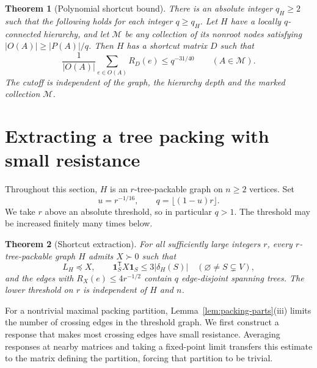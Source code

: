 \documentclass[11pt]{amsart}
\newtheorem{theorem}{Theorem}[section]
\theoremstyle{definition}
\theoremstyle{remark}
\numberwithin{equation}{section}
\begin{document}
\begin{theorem}[Polynomial shortcut bound]\label{thm:hierarchy-power}
There is an absolute integer $q_H\ge2$ such that the following holds for
each integer $q\ge q_H$.  Let $H$ have a locally $q$-connected hierarchy,
and let $\mathcal M$ be any collection of its nonroot nodes satisfying
$|O(A)|\ge |P(A)|/q$.  Then $H$ has a shortcut matrix $D$ such that
\begin{equation}\label{eq:hierarchy-power}
 \frac{1}{|O(A)|}\sum_{e\in O(A)}R_D(e)\le q^{-31/40}
 \qquad(A\in\mathcal M).
\end{equation}
The cutoff is independent of the graph, the hierarchy depth and the
marked collection $\mathcal M$.
\end{theorem}

\section{Extracting a tree packing with small resistance}
\label{sec:extraction}

Throughout this section, \(H\) is an \(r\)-tree-packable graph on
\(n\ge2\) vertices. Set
\begin{equation}\label{eq:parameters}
 u=r^{-1/16},\qquad q=\lfloor(1-u)r\rfloor.
\end{equation}
We take \(r\) above an absolute threshold, so in particular \(q>1\).
The threshold may be increased finitely many times below.

\begin{theorem}[Shortcut extraction]\label{thm:extraction}
For all sufficiently large integers \(r\), every \(r\)-tree-packable
graph \(H\) admits \(X\succ0\) such that
\begin{equation}\label{eq:shortcut-X}
 L_H\preceq X,\qquad
 \mathbf1_S^{\mathsf T}X\mathbf1_S\le3|\delta_H(S)|
 \quad(\varnothing\ne S\subsetneq V),
\end{equation}
and the edges with \(R_X(e)\le4r^{-1/2}\) contain \(q\)
edge-disjoint spanning trees. The lower threshold on \(r\) is
independent of \(H\) and \(n\).
\end{theorem}

For a nontrivial maximal packing partition,
Lemma~\ref{lem:packing-parts}(iii) limits the number of crossing edges
in the threshold graph. We first construct
a response that makes most crossing edges have small resistance.
Averaging responses at nearby matrices and taking a fixed-point limit transfers
this estimate to the matrix defining the partition, forcing that
partition to be trivial.
\end{document}
